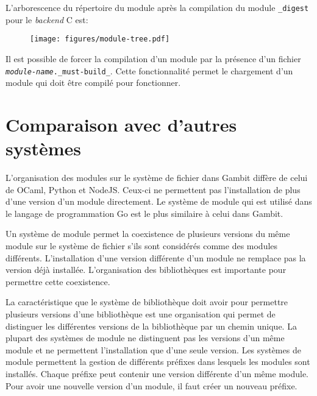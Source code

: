 \begin{center}
\end{center}

L'arborescence du répertoire du module après la compilation du module
\texttt{\_digest} pour le \textit{backend} C est:
%
\begin{figure}[ht]
  \centering
  \texttt{[image: figures/module-tree.pdf]}
\end{figure}

Il est possible de forcer la compilation d'un module par la présence d'un fichier
\texttt{\textit{module-name}.\_must-build\_}. Cette fonctionnalité permet le chargement d'un
module qui doit être compilé pour fonctionner.


\section{Comparaison avec d'autres systèmes}

L'organisation des modules sur le système de fichier dans Gambit
diffère de celui de OCaml, Python et NodeJS. Ceux-ci ne permettent pas
l'installation de plus d'une version d'un module directement. Le système
de module qui est utilisé dans le langage de programmation Go est le plus
similaire à celui dans Gambit.

Un système de module permet la coexistence de plusieurs versions du même module
sur le système de fichier s'ils sont considérés comme des modules différents.
L'installation d'une version différente d'un module ne remplace pas la version
déjà installée. L'organisation des bibliothèques est importante pour permettre
cette coexistence.

La caractéristique que le système de bibliothèque doit avoir pour permettre
plusieurs versions d'une bibliothèque est une organisation qui permet de
distinguer les différentes versions de la bibliothèque par un chemin unique.
La plupart des systèmes de module ne distinguent pas les versions d'un même
module et ne permettent l'installation que d'une seule version. Les systèmes de
module permettent la gestion de différents préfixes dans lesquels les modules sont
installés. Chaque préfixe peut contenir une version différente d'un même
module. Pour avoir une nouvelle version d'un module, il faut créer un nouveau
préfixe.



